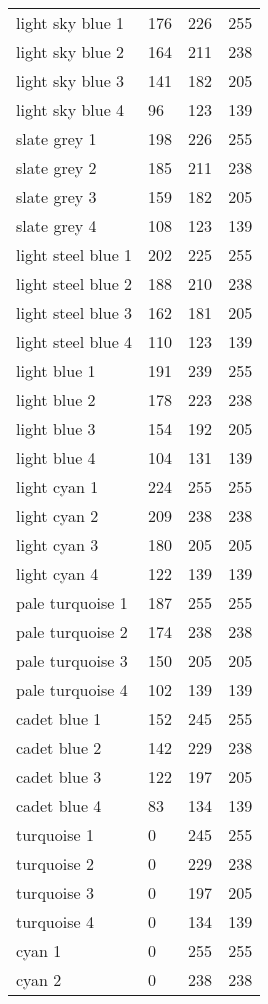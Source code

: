 \begin{center}
\begin{tabular}{llll}
  light sky blue 1 & 176 & 226 & 255  \\
  light sky blue 2 & 164 & 211 & 238  \\
  light sky blue 3 & 141 & 182 & 205  \\
  light sky blue 4 & 96 & 123 & 139  \\
  slate grey 1 & 198 & 226 & 255  \\
  slate grey 2 & 185 & 211 & 238  \\
  slate grey 3 & 159 & 182 & 205  \\
  slate grey 4 & 108 & 123 & 139  \\
  light steel blue 1 & 202 & 225 & 255  \\
  light steel blue 2 & 188 & 210 & 238  \\
  light steel blue 3 & 162 & 181 & 205  \\
  light steel blue 4 & 110 & 123 & 139  \\
  light blue 1 & 191 & 239 & 255  \\
  light blue 2 & 178 & 223 & 238  \\
  light blue 3 & 154 & 192 & 205  \\
  light blue 4 & 104 & 131 & 139  \\
  light cyan 1 & 224 & 255 & 255  \\
  light cyan 2 & 209 & 238 & 238  \\
  light cyan 3 & 180 & 205 & 205  \\
  light cyan 4 & 122 & 139 & 139  \\
  pale turquoise 1 & 187 & 255 & 255  \\
  pale turquoise 2 & 174 & 238 & 238  \\
  pale turquoise 3 & 150 & 205 & 205  \\
  pale turquoise 4 & 102 & 139 & 139  \\
  cadet blue 1 & 152 & 245 & 255  \\
  cadet blue 2 & 142 & 229 & 238  \\
  cadet blue 3 & 122 & 197 & 205  \\
  cadet blue 4 & 83 & 134 & 139  \\
  turquoise 1 & 0 & 245 & 255  \\
  turquoise 2 & 0 & 229 & 238  \\
  turquoise 3 & 0 & 197 & 205  \\
  turquoise 4 & 0 & 134 & 139  \\
  cyan 1 & 0 & 255 & 255  \\
  cyan 2 & 0 & 238 & 238  \\

\end{tabular}
\end{center}
